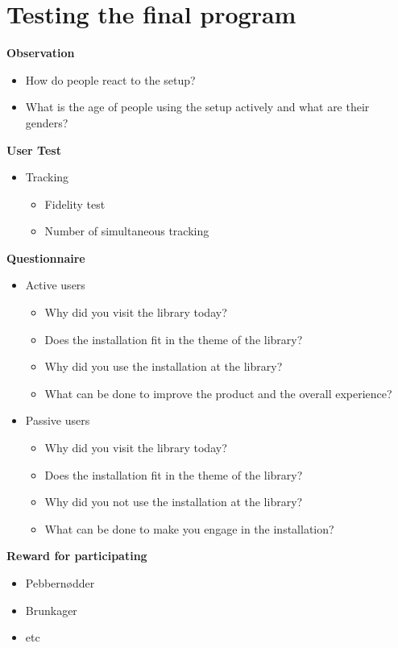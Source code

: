 \chapter{Testing the final program}
\textbf{Observation}
\begin{itemize}
\item How do people react to the setup?	
\item What is the age of people using the setup actively and what are their genders?
\end{itemize}

\textbf{User Test}
\begin{itemize}
\item Tracking
\begin{itemize}
\item Fidelity test
\item Number of simultaneous tracking
\end{itemize}
\end{itemize}

\textbf{Questionnaire}
\begin{itemize}
\item Active users
\begin{itemize}
\item Why did you visit the library today?
\item Does the installation fit in the theme of the library?
\item Why did you use the installation at the library?
\item What can be done to improve the product and the overall experience?
\end{itemize}
\item Passive users
\begin{itemize}
\item Why did you visit the library today?
\item Does the installation fit in the theme of the library?
\item Why did you not use the installation at the library?
\item What can be done to make you engage in the installation?
\end{itemize}
\end{itemize}
\textbf{Reward for participating}
\begin{itemize}
\item Pebbern{\o}dder
\item Brunkager
\item etc
\end{itemize}
